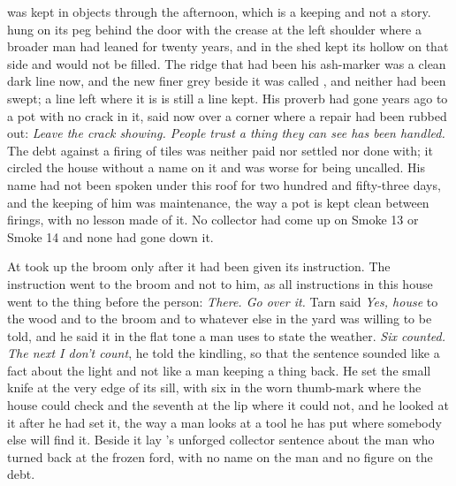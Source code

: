  was kept in objects through the afternoon, which is a keeping and not a story.  hung on its peg behind the door with the crease at the left shoulder where a broader man had leaned for twenty years, and  in the shed kept its hollow on that side and would not be filled. The ridge that had been his ash-marker was a clean dark line now, and the new finer grey beside it was called , and neither had been swept; a line left where it is is still a line kept. His proverb had gone years ago to a pot with no crack in it, said now over a corner where a repair had been rubbed out: \emph{Leave the crack showing. People trust a thing they can see has been handled.} The debt against a firing of tiles was neither paid nor settled nor done with; it circled the house without a name on it and was worse for being uncalled. His name had not been spoken under this roof for two hundred and fifty-three days, and the keeping of him was maintenance, the way a pot is kept clean between firings, with no lesson made of it. No collector had come up  on Smoke 13 or Smoke 14 and none had gone down it.

\scenebreak

At   took up the broom only after it had been given its instruction. The instruction went to the broom and not to him, as all instructions in this house went to the thing before the person: \emph{There. Go over it.} Tarn said \emph{Yes, house} to the wood and to the broom and to whatever else in the yard was willing to be told, and he said it in the flat tone a man uses to state the weather. \emph{Six counted. The next I don't count}, he told the kindling, so that the sentence sounded like a fact about the light and not like a man keeping a thing back. He set the small knife at the very edge of its sill, with six in the worn thumb-mark where the house could check and the seventh at the lip where it could not, and he looked at it after he had set it, the way a man looks at a tool he has put where somebody else will find it. Beside it lay 's unforged collector sentence about the man who turned back at the frozen ford, with no name on the man and no figure on the debt.

